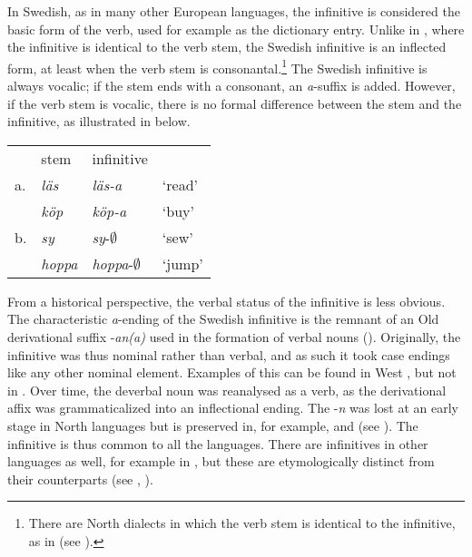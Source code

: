 \documentclass[output=paper]{langscibook}
\begin{document}
In Swedish, as in many other European languages, the infinitive is considered the basic form of the verb, used for example as the dictionary entry. Unlike in , where the infinitive is identical to the verb stem, the Swedish infinitive is an inflected form, at least when the verb stem is consonantal.\footnote{There are North  dialects in which the verb stem is identical to the infinitive, as in  (see \citealt{Delsing2014Verbsystemet}).}  The Swedish infinitive is always vocalic; if the stem ends with a consonant, an \textit{a}{}-suffix is added. However, if the verb stem is vocalic, there is no formal difference between the stem and the infinitive, as illustrated in  below. 


\ea\label{ex:kalm:2}
\begin{tabular}[t]{llll}
{} & stem & infinitive & {}\\
a. & \textit{läs} & \textit{läs-a} & ‘read’\\
{} & \textit{köp} & \textit{köp-a} & ‘buy’\\	
b. & \textit{sy} & \textit{sy}{}-${\emptyset}$ & ‘sew’\\
{} & \textit{hoppa} & \textit{hoppa}{}-${\emptyset}$ & ‘jump’\\
\end{tabular}
\z

From a historical perspective, the verbal status of the infinitive is less obvious. The characteristic \textit{a}{}-ending of the Swedish infinitive is the remnant of an Old  derivational suffix -\textit{an(a)} used in the formation of verbal nouns (\citealt[193]{FalkTorp1900}). Originally, the infinitive was thus nominal rather than verbal, and as such it took case endings like any other nominal element. Examples of this can be found in West , but not in  \citep[205]{Prokosch1939}. Over time, the deverbal noun was reanalysed as a verb, as the derivational affix was grammaticalized into an inflectional ending. The -\textit{n} was lost at an early stage in North  languages but is preserved in, for example,  and  (see \citealt[636]{Noreen1898}). The infinitive is thus common to all the  languages. There are infinitives in other  languages as well, for example in , but these are etymologically distinct from their  counterparts (see \citealt[205]{Prokosch1939}, \citealt[193]{FalkTorp1900}).
\end{document}
